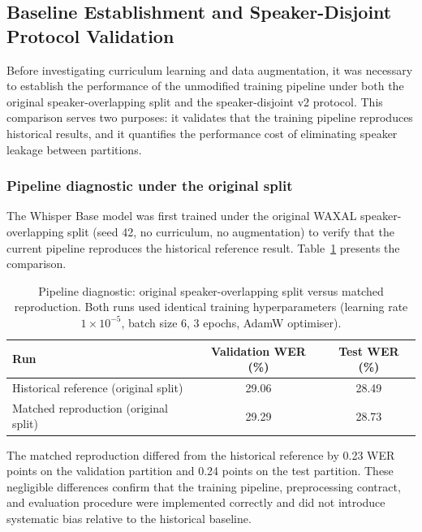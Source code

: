 \subsection{Baseline Establishment and Speaker-Disjoint Protocol Validation}
\label{sec:baseline-results}

Before investigating curriculum learning and data augmentation, it was necessary
to establish the performance of the unmodified training pipeline under both the
original speaker-overlapping split and the speaker-disjoint v2 protocol. This
comparison serves two purposes: it validates that the training pipeline
reproduces historical results, and it quantifies the performance cost of
eliminating speaker leakage between partitions.

\subsubsection{Pipeline diagnostic under the original split}

The Whisper Base model was first trained under the original WAXAL
speaker-overlapping split (seed 42, no curriculum, no augmentation) to verify
that the current pipeline reproduces the historical reference result.
Table~\ref{tab:protocol-diagnostic} presents the comparison.

\begin{table}[H]
\centering
\caption{Pipeline diagnostic: original speaker-overlapping split versus matched
reproduction. Both runs used identical training hyperparameters (learning rate
$1 \times 10^{-5}$, batch size 6, 3 epochs, AdamW optimiser).}
\label{tab:protocol-diagnostic}
\begin{tabular}{lcc}
\hline
\textbf{Run} & \textbf{Validation WER (\%)} & \textbf{Test WER (\%)} \\
\hline
Historical reference (original split) & 29.06 & 28.49 \\
Matched reproduction (original split) & 29.29 & 28.73 \\
\hline
\end{tabular}
\end{table}

The matched reproduction differed from the historical reference by 0.23 WER
points on the validation partition and 0.24 points on the test partition. These
negligible differences confirm that the training pipeline, preprocessing
contract, and evaluation procedure were implemented correctly and did not
introduce systematic bias relative to the historical baseline.

